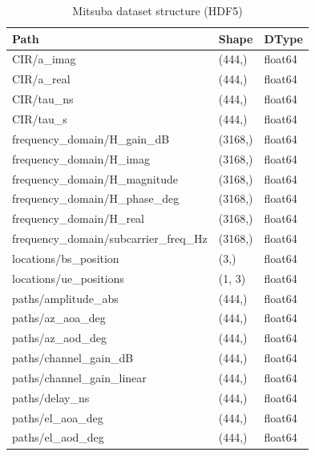 \begin{table}
\caption{Mitsuba dataset structure (HDF5)}
\label{tab:mitsuba_dataset}
\begin{tabular}{lll}
\toprule
Path & Shape & DType \\
\midrule
CIR/a\_imag & (444,) & float64 \\
CIR/a\_real & (444,) & float64 \\
CIR/tau\_ns & (444,) & float64 \\
CIR/tau\_s & (444,) & float64 \\
frequency\_domain/H\_gain\_dB & (3168,) & float64 \\
frequency\_domain/H\_imag & (3168,) & float64 \\
frequency\_domain/H\_magnitude & (3168,) & float64 \\
frequency\_domain/H\_phase\_deg & (3168,) & float64 \\
frequency\_domain/H\_real & (3168,) & float64 \\
frequency\_domain/subcarrier\_freq\_Hz & (3168,) & float64 \\
locations/bs\_position & (3,) & float64 \\
locations/ue\_positions & (1, 3) & float64 \\
paths/amplitude\_abs & (444,) & float64 \\
paths/az\_aoa\_deg & (444,) & float64 \\
paths/az\_aod\_deg & (444,) & float64 \\
paths/channel\_gain\_dB & (444,) & float64 \\
paths/channel\_gain\_linear & (444,) & float64 \\
paths/delay\_ns & (444,) & float64 \\
paths/el\_aoa\_deg & (444,) & float64 \\
paths/el\_aod\_deg & (444,) & float64 \\
\bottomrule
\end{tabular}
\end{table}
